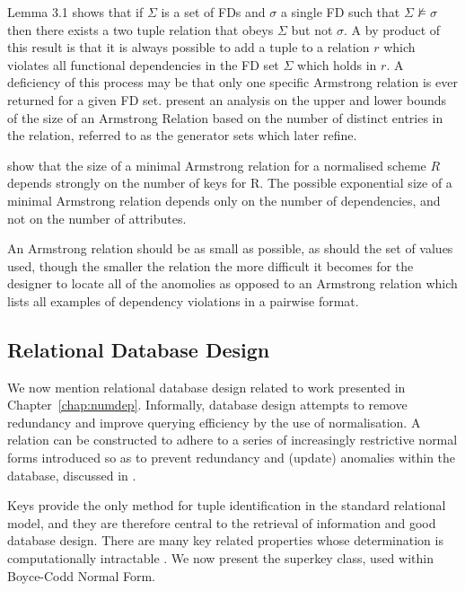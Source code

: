 Lemma 3.1 \cite{bdfs84} shows that if $\Sigma$ is a set of FDs and $\sigma$ a
single FD such that $\Sigma \not\models \sigma$ then there exists a two tuple
relation that obeys $\Sigma$ but not $\sigma$.  A by product of this result is
that it is always possible to add a tuple to a relation $r$ which violates all 
functional dependencies in the FD
set $\Sigma$ which holds in $r$.  A deficiency of this process may be that only one
specific Armstrong relation is ever returned for a given FD set.
\cite{bdfs84} present an analysis on the upper and lower bounds of the
size of an Armstrong Relation based on the number of distinct entries
in the relation, referred to as the generator sets which \cite{mr86}
later refine.


\cite{mr86} show that the size of a minimal Armstrong relation for a normalised
scheme $R$ depends strongly on the number of keys for R.  The possible exponential size of a minimal Armstrong relation depends only on the number of dependencies, and not on the number of attributes.

An Armstrong relation should be as small as possible, as should the set of values used, though the smaller the relation the more difficult it becomes for the designer to locate all of the anomolies as opposed to an Armstrong relation which lists all examples of dependency violations in a pairwise format.\\

\subsection{Relational Database Design}\label{subsec:reldbdes}


We now mention relational
database design related to work presented in
Chapter~\ref{chap:numdep}. Informally, database design attempts to
remove redundancy and improve querying efficiency by the use of normalisation.
A relation can be 
constructed to adhere to a series of increasingly restrictive normal forms introduced so as to prevent redundancy and (update) anomalies within the
database, discussed in 
\cite{cod72,databasefound,atze93,Date95,
Maier83,Ullm88}. 

\medskip

Keys provide the only method for tuple identification  in the standard
relational model, and they are
therefore central to the retrieval of information and good database design. There are many key
related properties whose determination is computationally intractable
\cite{lo78}. We now present the superkey class, used within Boyce-Codd
Normal Form.

